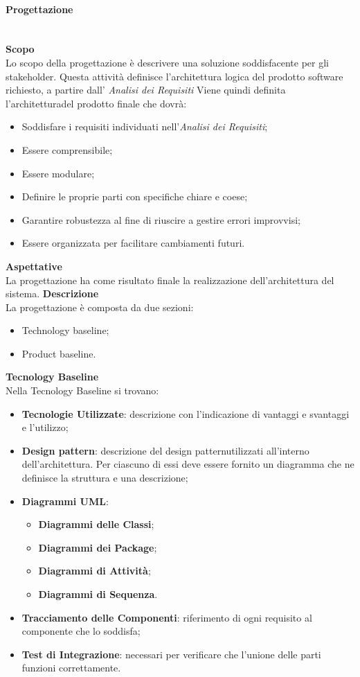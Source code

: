 \paragraph{Progettazione}\mbox{}\\ [1mm]
\textbf{Scopo}\\
Lo scopo della progettazione è descrivere una soluzione soddisfacente per gli stakeholder\glo. Questa attività definisce l'architettura logica del prodotto software richiesto, a partire dall' \textit{Analisi dei Requisiti}
Viene quindi definita l'architettura\glosp del prodotto finale che dovrà:
\begin{itemize}
	\item Soddisfare i requisiti individuati nell'\textit{Analisi dei Requisiti};
	\item Essere comprensibile;
	\item Essere modulare;
	\item Definire le proprie parti con specifiche chiare e coese;
	\item Garantire robustezza al fine di riuscire a gestire errori improvvisi;
	\item Essere organizzata per facilitare cambiamenti futuri.
\end{itemize}
\textbf{Aspettative}\\
La progettazione ha come risultato finale la realizzazione dell'architettura del sistema.
\textbf{Descrizione}\\
La progettazione è composta da due sezioni:
\begin{itemize}
	\item Technology baseline;
	\item Product baseline.	
\end{itemize}
\textbf{Tecnology Baseline}\\
Nella Tecnology Baseline si trovano:
\begin{itemize}
	\item \textbf{Tecnologie Utilizzate}: descrizione con l'indicazione di vantaggi e svantaggi e l'utilizzo;
	\item \textbf{Design pattern\glo}: descrizione del design pattern\glosp utilizzati all'interno dell'architettura. Per ciascuno di essi deve essere fornito un diagramma che ne definisce la struttura e una descrizione;
	\item \textbf{Diagrammi UML}:
	\begin{itemize}
		\item \textbf{Diagrammi delle Classi};
		\item \textbf{Diagrammi dei Package};
		\item \textbf{Diagrammi di Attività};
		\item \textbf{Diagrammi di Sequenza}.
	\end{itemize}
	\item \textbf{Tracciamento delle Componenti}: riferimento di ogni requisito al componente che lo soddisfa;
	\item \textbf{Test di Integrazione}: necessari per verificare che l'unione delle parti funzioni correttamente.
\end{itemize}
